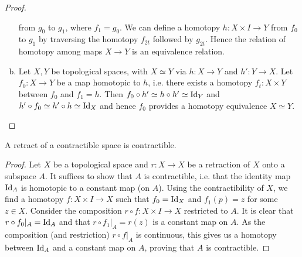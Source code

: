 \documentclass{../../mathnotes}
\begin{document}
\begin{proof}
\begin{enumerate}[(a)]
            from $g_0$ to $g_1$, where $f_1=g_0$. We can define a homotopy $h:X\times I\to Y$ from $f_0$ to $g_1$ by traversing
            the homotopy $f_{2t}$ followed by $g_{2t}$. Hence the relation of homotopy among maps $X\to Y$ is an
            equivalence relation.
        \item Let $X,Y$ be topological spaces, with $X\simeq Y$ via $h:X\to Y$ and $h':Y\to X$. Let $f_0:X\to Y$ be a map
            homotopic to $h$, i.e. there exists a homotopy $f_t:X\times Y$ between $f_0$ and $f_1=h$. Then
            $f_0\circ h'\simeq h\circ h'\simeq \operatorname{Id}_Y$ and $h'\circ f_0\simeq h'\circ h\simeq\operatorname{Id}_X$ and hence $f_0$ provides
            a homotopy equivalence $X\simeq Y$.
    \end{enumerate}
\end{proof}

\begin{prop}
    A retract of a contractible space is contractible.
\end{prop}
\begin{proof}
    Let $X$ be a topological space and $r:X\to X$ be a retraction of $X$ onto a subspace $A$.
    It suffices to show that $A$ is contractible, i.e. that the identity map $\operatorname{Id}_A$ is homotopic to a
    constant map (on $A$). Using the contractibility of $X$, we find a homotopy $f:X\times I\to X$ such
    that $f_0=\operatorname{Id}_X$ and $f_1(p)=z$ for some $z\in X$. Consider the composition $r\circ f:X\times I\to X$
    restricted to $A$.
    It is clear that $r\circ f_0|_A=\operatorname{Id}_A$ and that $r\circ f_1|_A=r(z)$ is a constant map on $A$.
    As the composition (and restriction) $r\circ f|_A$ is continuous, this gives us a homotopy between
    $\operatorname{Id}_A$ and a constant map on $A$, proving that $A$ is contractible.
\end{proof}
\end{document}
